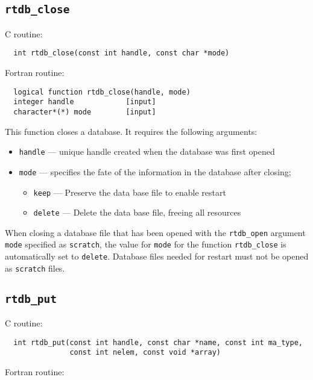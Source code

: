 \subsection{{\tt rtdb\_close}}

C routine:

\begin{verbatim}
  int rtdb_close(const int handle, const char *mode)
\end{verbatim}


Fortran routine:

\begin{verbatim}
  logical function rtdb_close(handle, mode)
  integer handle            [input]
  character*(*) mode        [input]
\end{verbatim}
This function closes a database. It requires the following arguments:
\begin{itemize}
\item {\tt handle} --- unique handle created when the database was first opened
\item {\tt mode} --- specifies the fate of the information in the database after closing;
\begin{itemize}
\item {\tt keep} ---    Preserve the data base file to enable restart
\item {\tt delete} ---  Delete the data base file, freeing all resources
\end{itemize}
\end{itemize}
When closing a database file that has been opened with the {\tt rtdb\_open} argument
{\tt mode} specified as {\tt scratch}, the value for {\tt mode} for the function
{\tt rtdb\_close} is automatically set to {\tt delete}.  Database files needed for
restart must not be opened as {\tt scratch} files.

\subsection{{\tt rtdb\_put}}

C routine:

\begin{verbatim}
  int rtdb_put(const int handle, const char *name, const int ma_type,
               const int nelem, const void *array)
\end{verbatim}


Fortran routine:

